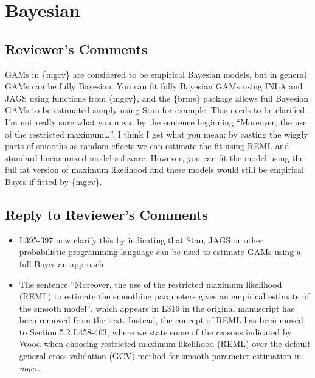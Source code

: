 \documentclass[
]{article}
\begin{document}
\hypertarget{bayesian}{%
\section{Bayesian}\label{bayesian}}

\hypertarget{reviewers-comments-6}{%
\subsection{Reviewer's Comments}\label{reviewers-comments-6}}

GAMs in \{mgcv\} are considered to be empirical Bayesian models, but in general GAMs can be fully Bayesian. You can fit fully Bayesian GAMs using INLA and JAGS using functions from \{mgcv\}, and the \{brms\} package allows full Bayesian GAMs to be estimated simply using Stan for example. This needs to be clarified.
I'm not really sure what you mean by the sentence beginning ``Moreover, the use of the restricted maximum\ldots{}''. I think I get what you mean; by casting the wiggly parts of smooths as random effects we can estimate the fit using REML
and standard linear mixed model software. However, you can fit the model using the full fat version of maximum likelihood and these models would still be empirical Bayes if fitted by \{mgcv\}.

\hypertarget{section-7}{%
\subsection{\texorpdfstring{\textcolor{reviewersblue} {Reply to Reviewer's Comments}}{}}\label{section-7}}

\begin{itemize}
\item
  L395-397 now clarify this by indicating that Stan, JAGS or other probabilistic programming language can be used to estimate GAMs using a full Bayesian approach.
\item
  The sentence ``Moreover, the use of the restricted maximum likelihood (REML) to estimate the smoothing parameters gives an empirical estimate of the smooth model'', which appears in L319 in the original manuscript has been removed from the text. Instead, the concept of REML has been moved to Section 5.2 L458-463, where we state some of the reasons indicated by Wood when choosing restricted maximum likelihood (REML) over the default general cross validation (GCV) method for smooth parameter estimation in \emph{mgcv}.
\end{itemize}
\end{document}
